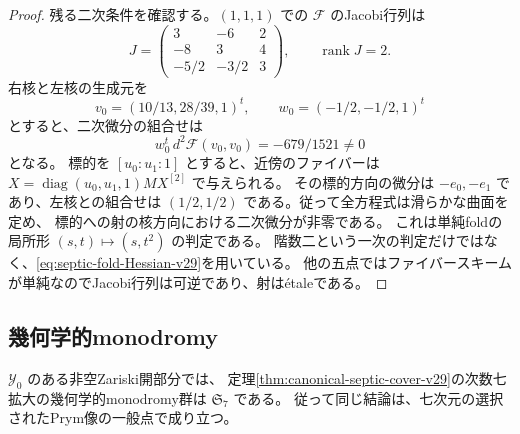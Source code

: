 \begin{proof}
残る二次条件を確認する。$(1,1,1)$ での $\mathcal F$ のJacobi行列は
\[
 J=\begin{pmatrix}3&-6&2\\-8&3&4\\-5/2&-3/2&3\end{pmatrix},
 \qquad\operatorname{rank}J=2.
\]
右核と左核の生成元を
\[
 v_0=(10/13,28/39,1)^t,\qquad w_0=(-1/2,-1/2,1)^t
\]
とすると、二次微分の組合せは
\begin{equation}\label{eq:septic-fold-Hessian-v29}
 w_0^t\,d^2\mathcal F(v_0,v_0)=-679/1521\ne0
\end{equation}
となる。
標的を $[u_0:u_1:1]$ とすると、近傍のファイバーは
$X=\operatorname{diag}(u_0,u_1,1)MX^{[2]}$ で与えられる。
その標的方向の微分は $-e_0,-e_1$ であり、左核との組合せは
$(1/2,1/2)$ である。従って全方程式は滑らかな曲面を定め、
標的への射の核方向における二次微分が非零である。
これは単純foldの局所形 $(s,t)\mapsto(s,t^2)$ の判定である。
階数二という一次の判定だけではなく、\eqref{eq:septic-fold-Hessian-v29}を用いている。
他の五点ではファイバースキームが単純なのでJacobi行列は可逆であり、射は\'etaleである。
\end{proof}

\subsection{幾何学的monodromy}

\begin{theorem}[完全対称群の実現]
\label{thm:septic-Sseven-v29}
$\mathcal Y_0$ のある非空Zariski開部分では、
定理\ref{thm:canonical-septic-cover-v29}の次数七拡大の幾何学的monodromy群は
$\mathfrak S_7$ である。
従って同じ結論は、七次元の選択されたPrym像の一般点で成り立つ。
\end{theorem}

